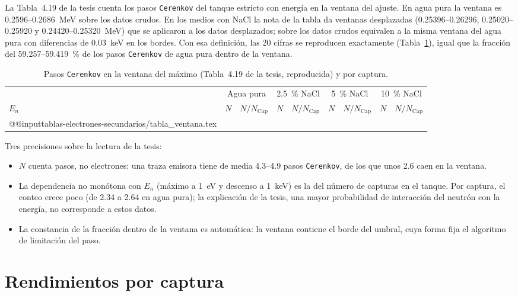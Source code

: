 \documentclass[11pt,a4paper]{article}
\newcommand{\tablas}{tablas-electrones-secundarios}
\newcommand{\var}[1]{\texttt{#1}}
\begin{document}
La Tabla~4.19 de la tesis cuenta los pasos \var{Cerenkov} del tanque estricto con energía en la ventana del ajuste. En agua pura la ventana es 0.2596--0.2686~MeV sobre los datos crudos. En los medios con NaCl la nota de la tabla da ventanas desplazadas (0.25396--0.26296, 0.25020--0.25920 y 0.24420--0.25320~MeV) que se aplicaron a los datos desplazados; sobre los datos crudos equivalen a la misma ventana del agua pura con diferencias de 0.03~keV en los bordes. Con esa definición, las 20 cifras se reproducen exactamente (Tabla~\ref{tab:ventana}), igual que la fracción del 59.257--59.419~\% de los pasos \var{Cerenkov} de agua pura dentro de la ventana.

\begin{table}[H]
\centering\small
\setlength{\tabcolsep}{4pt}
\caption{Pasos \var{Cerenkov} en la ventana del máximo (Tabla~4.19 de la tesis, reproducida) y por captura.}
\label{tab:ventana}
\begin{tabular}{@{}lrrrrrrrr@{}}
\toprule
& \multicolumn{2}{c}{Agua pura} & \multicolumn{2}{c}{2.5~\% NaCl} & \multicolumn{2}{c}{5~\% NaCl} & \multicolumn{2}{c}{10~\% NaCl} \\
$E_n$ & $N$ & $N/N_\mathrm{Cap}$ & $N$ & $N/N_\mathrm{Cap}$ & $N$ & $N/N_\mathrm{Cap}$ & $N$ & $N/N_\mathrm{Cap}$ \\
\midrule
\csname @@input\endcsname \tablas/tabla_ventana.tex
\bottomrule
\end{tabular}
\end{table}

Tres precisiones sobre la lectura de la tesis:
\begin{itemize}
  \item $N$ cuenta pasos, no electrones: una traza emisora tiene de media 4.3--4.9 pasos \var{Cerenkov}, de los que unos 2.6 caen en la ventana.
  \item La dependencia no monótona con $E_n$ (máximo a 1~eV y descenso a 1~keV) es la del número de capturas en el tanque. Por captura, el conteo crece poco (de 2.34 a 2.64 en agua pura); la explicación de la tesis, una mayor probabilidad de interacción del neutrón con la energía, no corresponde a estos datos.
  \item La constancia de la fracción dentro de la ventana es automática: la ventana contiene el borde del umbral, cuya forma fija el algoritmo de limitación del paso.
\end{itemize}

\section{Rendimientos por captura}
\label{sec:rendimientos}
\end{document}

